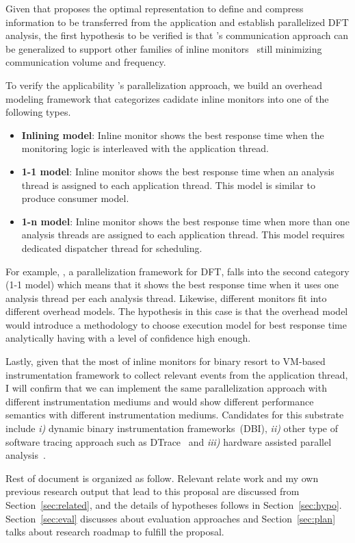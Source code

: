 %
%
Given that \sreplica proposes the optimal representation to define and compress
information to be transferred from the application and establish parallelized
DFT analysis, the first hypothesis to be verified is that \sreplica's
communication approach can be generalized to support other families of inline
monitors~\cite{CAB} still minimizing communication volume and
frequency.

To verify the applicability \sreplica's parallelization approach, we build an
overhead modeling framework that categorizes cadidate inline monitors into one
of the following types.

\begin{itemize}

    \item {\bf Inlining model}: Inline monitor shows the best response time
            when the monitoring logic is interleaved with the application
            thread.

    \item {\bf 1-1 model}: Inline monitor shows the best response time when an
            analysis thread is assigned to each application thread. This model
            is similar to produce consumer model.

    \item {\bf 1-n model}: Inline monitor shows the best response time when
            more than one analysis threads are assigned to each application
            thread.  This model requires dedicated dispatcher thread for
            scheduling.
    \end{itemize}

For example, \sreplica, a parallelization framework for DFT,  falls into the
second category (1-1 model) which means that it shows the best response time
when it uses one analysis thread per each analysis thread. Likewise, different
monitors fit into different overhead models. The hypothesis in this case is
that the overhead model would introduce a methodology to choose execution model
for best response time analytically having with a level of confidence high
enough.
 
Lastly, given that the most of inline monitors for binary resort to VM-based
instrumentation framework to collect relevant events from the application
thread, I will confirm that we can implement the same parallelization approach
with different instrumentation mediums and would show different performance
semantics with different instrumentation mediums. Candidates for this substrate
include {\it i)} dynamic binary instrumentation frameworks~(DBI), {\it ii)}
other type of software tracing approach such as DTrace~\cite{DTrace} and {\it
iii)} hardware assisted parallel analysis~\cite{lba}.

Rest of document is organized as follow. Relevant relate work and my own
previous research output that lead to this proposal are discussed from
Section~\ref{sec:related}, and the details of hypotheses follows in
Section~\ref{sec:hypo}. Section~\ref{sec:eval} discusses about evaluation
approaches and Section~\ref{sec:plan} talks about research roadmap to fulfill
the proposal.

